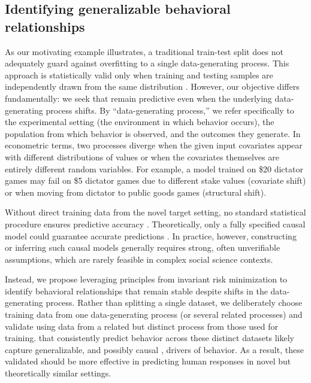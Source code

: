 \subsection{Identifying generalizable behavioral relationships}

As our motivating example illustrates, a traditional train-test split does not adequately guard against overfitting to a single data-generating process. 
This approach is statistically valid only when training and testing samples are independently drawn from the same distribution \citep{statisticalvapnik1998}. 
However, our objective differs fundamentally: we seek  that remain predictive even when the underlying data-generating process shifts.
By ``data-generating process,'' we refer specifically to the experimental setting (the environment in which behavior occurs), the population from which behavior is observed, and the outcomes they generate.
In econometric terms, two processes diverge when the given input covariates appear with different distributions of values or when the covariates themselves are entirely different random variables.
For example, a model trained on \$20 dictator games may fail on \$5 dictator games due to different stake values (covariate shift) or when moving from dictator to public goods games (structural shift).

Without direct training data from the novel target setting, no standard statistical procedure ensures predictive accuracy \citep{ben2010theory,Klivans2024Domain}. 
Theoretically, only a fully specified causal model could guarantee accurate predictions \citep{Pearl2009Causality}. 
In practice, however, constructing or inferring such causal models generally requires strong, often unverifiable assumptions, which are rarely feasible in complex social science contexts.

Instead, we propose leveraging principles from invariant risk minimization \citep{arjovsky2020invariant} to identify behavioral relationships that remain stable despite shifts in the data-generating process. 
Rather than splitting a single dataset, we deliberately choose training data from one data-generating process (or several related processes) and validate using data from a related but distinct process from those used for training.
 that consistently predict behavior across these distinct datasets likely capture generalizable, and possibly causal \citep{Peters2016invariant, Heinze2018invariant}, drivers of behavior.
As a result, these validated  should be more effective in predicting human responses in novel but theoretically similar settings.

